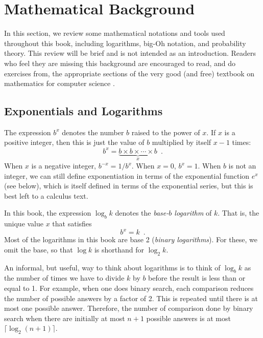 					\section{Mathematical Background}

					In this section, we review some mathematical notations and tools used throughout this book, including logarithms, big-Oh notation, and probability theory.  This review will be brief and is not intended as an introduction. Readers who feel they are missing this background are encouraged to read, and do exercises from, the appropriate sections of the very good (and free) textbook on mathematics for computer science \cite{llm11}.

					\subsection{Exponentials and Logarithms}

					The expression $b^x$ denotes the number $b$ raised to the power of $x$.  If $x$ is a positive integer, then this is just the value of $b$ multiplied by itself $x-1$ times:
					\[
					b^x = \underbrace{b\times b\times \cdots \times b}_{x} \enspace .
					\]
					When $x$ is a negative integer, $b^{-x}=1/b^{x}$.  When $x=0$, $b^x=1$.  When $b$ is not an integer, we can still define exponentiation in terms of the exponential function $e^x$ (see below), which is itself defined in terms of the exponential series, but this is best left to a calculus text.

					In this book, the expression $\log_b k$ denotes the \emph{base-$b$ logarithm} of $k$.  That is, the unique value $x$ that satisfies
					\[
					b^{x} = k  \enspace .
\]
Most of the logarithms in this book are base 2 (\emph{binary logarithms}).    For these, we omit the base, so that $\log k$ is shorthand for $\log_2 k$.

An informal, but useful, way to think about logarithms is to think of $\log_b k$ as the number of times we have to divide $k$ by $b$ before the result is less than or equal to 1.  For example, when one does binary search, each comparison reduces the number of possible answers by a factor of 2.  This is repeated until there is at most one possible answer.  Therefore, the number of comparison done by binary search when there are initially at most $n+1$ possible answers is at most $\lceil\log_2(n+1)\rceil$.

